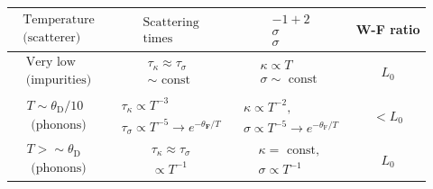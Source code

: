 \documentclass[12pt,a4paper]{article}
\begin{document}
\begin{tabular}{|c|c|c|c|}
    \hline $\begin{array}{l}\text { Temperature } \\
    \text { (scatterer) }\end{array}$ & $\begin{array}{l}\text { Scattering } \\
    \text { times }\end{array}$ & $\begin{array}{l}-1+2 \\
    \sigma \\
    \sigma\end{array}$ & W-F ratio \\
    \hline $\begin{array}{l}\text { Very low } \\
    \text { (impurities) }\end{array}$ & $\begin{array}{l}\tau_\kappa \approx \tau_\sigma \\
    \sim \text { const }\end{array}$ & $\begin{array}{l}\kappa \propto T \\
    \sigma \sim \text { const }\end{array}$ & $L_0$ \\
    \hline $\begin{array}{l}T \sim \theta_{\mathrm{D}} / 10 \\
    \text { (phonons) }\end{array}$ & $\begin{array}{l}\tau_\kappa \propto T^{-3} \\
    \tau_\sigma \propto T^{-5} \rightarrow e^{-\theta_{\mathbf{F}} / T}\end{array}$ & $\begin{array}{l}\kappa \propto T^{-2}, \\
    \sigma \propto T^{-5} \rightarrow e^{-\theta_{\mathrm{F}} / T}\end{array}$ & $<L_0$ \\
    \hline $\begin{array}{l}T>\sim \theta_{\mathrm{D}} \\
    \text { (phonons) }\end{array}$ & $\begin{array}{l}\tau_\kappa \approx \tau_\sigma \\
    \propto T^{-1}\end{array}$ & $\begin{array}{l}\kappa=\text { const, } \\
    \sigma \propto T^{-1}\end{array}$ & $L_0$ \\
    \hline
\end{tabular}
\end{document}
